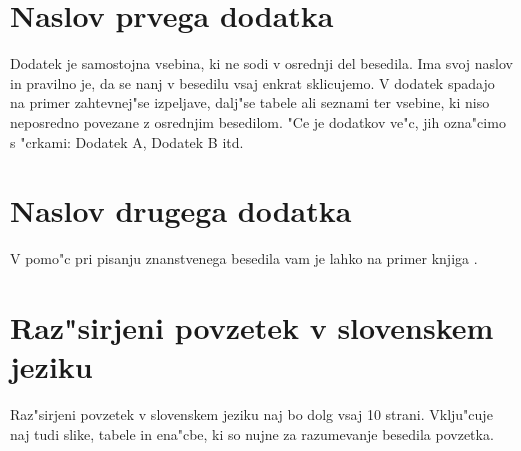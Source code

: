 
\cleardoublepage

\begin{appendices}

\chapter{Naslov prvega dodatka}
    
Dodatek je samostojna vsebina, ki ne sodi v osrednji del besedila. 
Ima svoj naslov in pravilno je, da se nanj v besedilu vsaj enkrat sklicujemo.
V dodatek spadajo na primer zahtevnej"se izpeljave, dalj"se tabele 
ali seznami ter vsebine, ki niso neposredno povezane z osrednjim besedilom. 
"Ce je dodatkov ve"c, jih ozna"cimo s "crkami: Dodatek A, Dodatek B itd.

\chapter{Naslov drugega dodatka}
    
V pomo"c pri pisanju znanstvenega besedila vam je lahko na primer knjiga 
\cite{All}. 

\end{appendices}

\cleardoublepage{}
{}
\chapter*{Raz"sirjeni povzetek v slovenskem jeziku}

Raz"sirjeni povzetek v slovenskem jeziku naj bo dolg vsaj 10 strani. 
Vklju"cuje naj tudi slike, tabele in ena"cbe, ki so nujne za razumevanje 
besedila povzetka.



\cleardoublepage
\printindex


